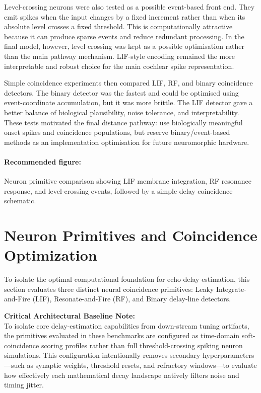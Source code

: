 Level-crossing neurons were also tested as a possible event-based front end. They emit spikes when the input changes by a fixed increment rather than when its absolute level crosses a fixed threshold. This is computationally attractive because it can produce sparse events and reduce redundant processing. In the final model, however, level crossing was kept as a possible optimisation rather than the main pathway mechanism. LIF-style encoding remained the more interpretable and robust choice for the main cochlear spike representation.

Simple coincidence experiments then compared LIF, RF, and binary coincidence detectors. The binary detector was the fastest and could be optimised using event-coordinate accumulation, but it was more brittle. The LIF detector gave a better balance of biological plausibility, noise tolerance, and interpretability. These tests motivated the final distance pathway: use biologically meaningful onset spikes and coincidence populations, but reserve binary/event-based methods as an implementation optimisation for future neuromorphic hardware.

\paragraph{Recommended figure:} Neuron primitive comparison showing LIF membrane integration, RF resonance response, and level-crossing events, followed by a simple delay coincidence schematic.

\section{Neuron Primitives and Coincidence Optimization}

To isolate the optimal computational foundation for echo-delay estimation, this section evaluates three distinct neural coincidence primitives: Leaky Integrate-and-Fire (LIF), Resonate-and-Fire (RF), and Binary delay-line detectors. 

\begin{nodebox}
\noindent\textbf{Critical Architectural Baseline Note:} \\
To isolate core delay-estimation capabilities from down-stream tuning artifacts, the primitives evaluated in these benchmarks are configured as time-domain soft-coincidence scoring profiles rather than full threshold-crossing spiking neuron simulations. This configuration intentionally removes secondary hyperparameters---such as synaptic weights, threshold resets, and refractory windows---to evaluate how effectively each mathematical decay landscape natively filters noise and timing jitter.
\end{nodebox}


